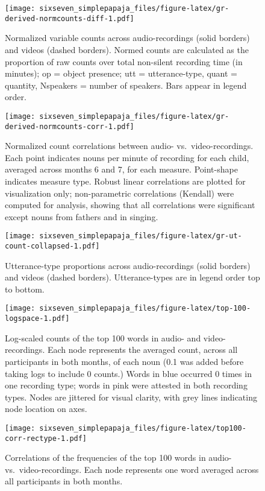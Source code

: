 \documentclass[man]{apa6}
\theoremstyle{definition}
\theoremstyle{definition}
\theoremstyle{definition}
\theoremstyle{remark}
\begin{document}
\begin{figure}[htbp]
\centering
\texttt{[image: sixseven\_simplepapaja\_files/figure-latex/gr-derived-normcounts-diff-1.pdf]}
\caption{\label{fig:gr-derived-normcounts-diff}Normalized variable counts
across audio-recordings (solid borders) and videos (dashed borders).
Normed counts are calculated as the proportion of raw counts over total
non-silent recording time (in minutes); op = object presence; utt =
utterance-type, quant = quantity, Nspeakers = number of speakers. Bars
appear in legend order.}
\end{figure}

\begin{figure}[htbp]
\centering
\texttt{[image: sixseven\_simplepapaja\_files/figure-latex/gr-derived-normcounts-corr-1.pdf]}
\caption{\label{fig:gr-derived-normcounts-corr}Normalized count correlations
between audio- vs.~video-recordings. Each point indicates nouns per
minute of recording for each child, averaged across months 6 and 7, for
each measure. Point-shape indicates measure type. Robust linear
correlations are plotted for visualization only; non-parametric
correlations (Kendall) were computed for analysis, showing that all
correlations were significant except nouns from fathers and in singing.}
\end{figure}

\begin{figure}[htbp]
\centering
\texttt{[image: sixseven\_simplepapaja\_files/figure-latex/gr-ut-count-collapsed-1.pdf]}
\caption{\label{fig:gr-ut-count-collapsed}Utterance-type proportions across
audio-recordings (solid borders) and videos (dashed borders).
Utterance-types are in legend order top to bottom.}
\end{figure}

\begin{figure}[htbp]
\centering
\texttt{[image: sixseven\_simplepapaja\_files/figure-latex/top-100-logspace-1.pdf]}
\caption{\label{fig:top-100-logspace}Log-scaled counts of the top 100 words
in audio- and video-recordings. Each node represents the averaged count,
across all participants in both months, of each noun (0.1 was added
before taking logs to include 0 counts.) Words in blue occurred 0 times
in one recording type; words in pink were attested in both recording
types. Nodes are jittered for visual clarity, with grey lines indicating
node location on axes.}
\end{figure}

\begin{figure}[htbp]
\centering
\texttt{[image: sixseven\_simplepapaja\_files/figure-latex/top100-corr-rectype-1.pdf]}
\caption{\label{fig:top100-corr-rectype}Correlations of the frequencies of
the top 100 words in audio- vs.~video-recordings. Each node represents
one word averaged across all participants in both months.}
\end{figure}
\end{document}
